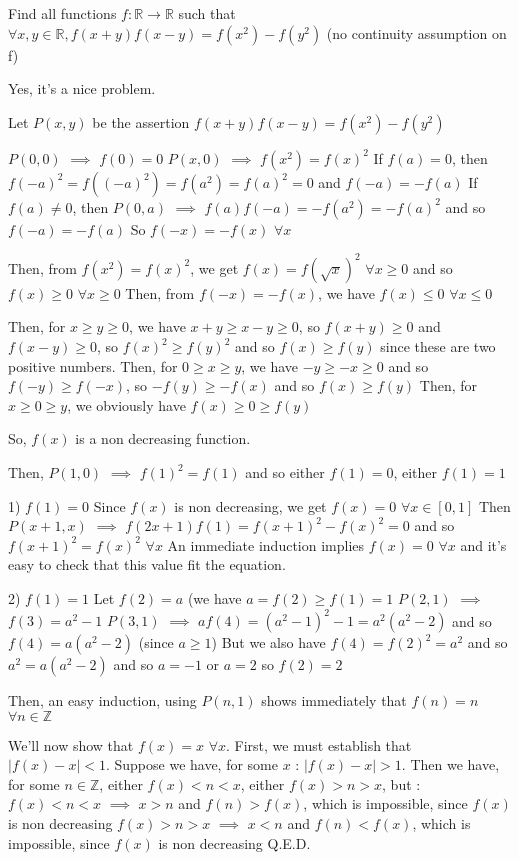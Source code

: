 \begin{solution}
	\begin{tcolorbox}Find all functions $ f: \mathbb{R}\rightarrow \mathbb{R}$ such that $ \forall x,y\in\mathbb{R},f(x + y)f(x - y) = f(x^2) - f(y^2)$
(no continuity assumption on f)\end{tcolorbox}

Yes, it's a nice problem.

Let $ P(x,y)$ be the assertion $ f(x+y)f(x-y)=f(x^2)-f(y^2)$

$ P(0,0)$ $ \implies$ $ f(0)=0$
$ P(x,0)$ $ \implies$ $ f(x^2)=f(x)^2$
If $ f(a)=0$, then $ f(-a)^2=f((-a)^2)=f(a^2)=f(a)^2=0$ and $ f(-a)=-f(a)$ 
If $ f(a)\neq 0$, then $ P(0,a)$ $ \implies$ $ f(a)f(-a)=-f(a^2)= -f(a)^2$ and so $ f(-a)=-f(a)$
So $ f(-x)=-f(x)$ $ \forall x$

Then, from $ f(x^2)=f(x)^2$, we get $ f(x)=f(\sqrt x)^2$ $ \forall x\geq 0$ and so $ f(x)\geq 0$ $ \forall x\geq 0$
Then, from $ f(-x)=-f(x)$, we have $ f(x)\leq 0$ $ \forall x\leq 0$

Then, for $ x\geq y\geq 0$, we have $ x+y\geq x-y\geq 0$, so $ f(x+y)\geq 0$ and $ f(x-y)\geq 0$, so $ f(x)^2\geq f(y)^2$ and so $ f(x)\geq f(y)$ since these are two positive numbers.
Then, for $ 0\geq x\geq y$, we have $ -y\geq -x\geq 0$ and so $ f(-y)\geq f(-x)$, so $ -f(y)\geq -f(x)$ and so $ f(x)\geq f(y)$
Then, for $ x\geq 0\geq y$, we obviously have $ f(x)\geq 0 \geq f(y)$

So, $ f(x)$ is  a non decreasing function.

Then, $ P(1,0)$ $ \implies$ $ f(1)^2=f(1)$ and so either $ f(1)=0$, either $ f(1)=1$

1) $ f(1)=0$
Since $ f(x)$ is non decreasing, we get $ f(x)=0$ $ \forall x\in[0,1]$
Then $ P(x+1,x)$ $ \implies$ $ f(2x+1)f(1)=f(x+1)^2-f(x)^2=0$ and so $ f(x+1)^2=f(x)^2$ $ \forall x$
An immediate induction implies $ f(x)=0$ $ \forall x$ and it's easy to check that this value fit the equation.

2) $ f(1)=1$
Let $ f(2)=a$ (we have $ a=f(2)\geq f(1)=1$
$ P(2,1)$ $ \implies$ $ f(3)=a^2-1$
$ P(3,1)$ $ \implies$ $ af(4)=(a^2-1)^2-1=a^2(a^2-2)$ and so $ f(4)=a(a^2-2)$ (since $ a\geq 1$)
But we also have $ f(4)=f(2)^2=a^2$ and so $ a^2=a(a^2-2)$ and so $ a=-1$ or $ a=2$ so $ f(2)=2$

Then, an easy induction, using $ P(n,1)$ shows immediately that $ f(n)=n$ $ \forall n\in \mathbb{Z}$

We'll now show that $ f(x)=x$ $ \forall x$.
First, we must establish that $ |f(x)-x|<1$.
Suppose we have, for some $ x$ : $ |f(x)-x|>1$. Then we have, for some $ n\in\mathbb{Z}$, either $ f(x)<n<x$, either $ f(x)>n>x$, but :
$ f(x)<n<x$ $ \implies$ $ x>n$ and $ f(n)>f(x)$, which is impossible, since $ f(x)$ is non decreasing
$ f(x)>n>x$ $ \implies$ $ x<n$ and $ f(n)<f(x)$, which is impossible, since $ f(x)$ is non decreasing
Q.E.D.


\end{solution}
